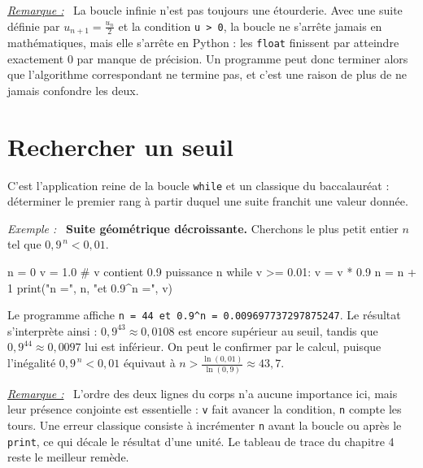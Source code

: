 \documentclass[a4paper,11pt,openany]{book}
\newcommand{\code}[1]{\texttt{\textcolor{codebleu}{#1}}}
\newenvironment{exemple}%
 {\par\vspace{1mm}\begin{list}{}{\leftmargin=1cm \rightmargin=0.5cm}\item[]%
  \textit{Exemple :}~}%
 {\end{list}\vspace{1mm}}
\newenvironment{remarque}%
 {\par\vspace{1mm}\begin{list}{}{\leftmargin=1cm \rightmargin=0.5cm}\item[]%
  \textit{\underline{Remarque :}}~}%
 {\end{list}\vspace{1mm}}
\begin{document}
\begin{remarque}
La boucle infinie n'est pas toujours une étourderie. Avec une suite définie par $u_{n+1} = \tfrac{u_n}{2}$ et la condition \code{u > 0}, la boucle ne s'arrête jamais en mathématiques, mais elle s'arrête en Python : les \code{float} finissent par atteindre exactement $0$ par manque de précision. Un programme peut donc terminer alors que l'algorithme correspondant ne termine pas, et c'est une raison de plus de ne jamais confondre les deux.
\end{remarque}

\section{Rechercher un seuil}

C'est l'application reine de la boucle \code{while} et un classique du baccalauréat : déterminer le premier rang à partir duquel une suite franchit une valeur donnée.

\begin{exemple}
\textbf{Suite géométrique décroissante.} Cherchons le plus petit entier $n$ tel que $0{,}9^{\,n} < 0{,}01$.
\begin{python}
n = 0
v = 1.0          # v contient 0.9 puissance n
while v >= 0.01:
    v = v * 0.9
    n = n + 1
print("n =", n, "et 0.9^n =", v)
\end{python}
Le programme affiche \code{n = 44 et 0.9\textasciicircum{}n = 0.009697737297875247}. Le résultat s'interprète ainsi : $0{,}9^{43} \approx 0{,}0108$ est encore supérieur au seuil, tandis que $0{,}9^{44} \approx 0{,}0097$ lui est inférieur. On peut le confirmer par le calcul, puisque l'inégalité $0{,}9^{\,n} < 0{,}01$ équivaut à $n > \frac{\ln(0{,}01)}{\ln(0{,}9)} \approx 43{,}7$.
\end{exemple}

\begin{remarque}
L'ordre des deux lignes du corps n'a aucune importance ici, mais leur présence conjointe est essentielle : \code{v} fait avancer la condition, \code{n} compte les tours. Une erreur classique consiste à incrémenter \code{n} avant la boucle ou après le \code{print}, ce qui décale le résultat d'une unité. Le tableau de trace du chapitre 4 reste le meilleur remède.
\end{remarque}
\end{document}
